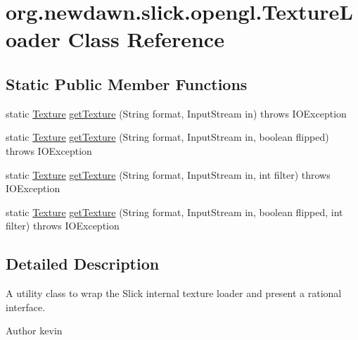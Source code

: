 \hypertarget{classorg_1_1newdawn_1_1slick_1_1opengl_1_1_texture_loader}{}\section{org.\+newdawn.\+slick.\+opengl.\+Texture\+Loader Class Reference}
\label{classorg_1_1newdawn_1_1slick_1_1opengl_1_1_texture_loader}
\subsection*{Static Public Member Functions}
\begin{DoxyCompactItemize}
\item 
static \mbox{\hyperlink{interfaceorg_1_1newdawn_1_1slick_1_1opengl_1_1_texture}{Texture}} \mbox{\hyperlink{classorg_1_1newdawn_1_1slick_1_1opengl_1_1_texture_loader_a742a83fc3fa1b8c4183e9950c7576adb}{get\+Texture}} (String format, Input\+Stream in)  throws I\+O\+Exception 
\item 
static \mbox{\hyperlink{interfaceorg_1_1newdawn_1_1slick_1_1opengl_1_1_texture}{Texture}} \mbox{\hyperlink{classorg_1_1newdawn_1_1slick_1_1opengl_1_1_texture_loader_a97fc2430793c0c8f883e6b9f6ab88758}{get\+Texture}} (String format, Input\+Stream in, boolean flipped)  throws I\+O\+Exception 
\item 
static \mbox{\hyperlink{interfaceorg_1_1newdawn_1_1slick_1_1opengl_1_1_texture}{Texture}} \mbox{\hyperlink{classorg_1_1newdawn_1_1slick_1_1opengl_1_1_texture_loader_a9fb5ca2c112a95bff54fc895b3c648e9}{get\+Texture}} (String format, Input\+Stream in, int filter)  throws I\+O\+Exception 
\item 
static \mbox{\hyperlink{interfaceorg_1_1newdawn_1_1slick_1_1opengl_1_1_texture}{Texture}} \mbox{\hyperlink{classorg_1_1newdawn_1_1slick_1_1opengl_1_1_texture_loader_accafa2eb13a83a40e3af6f4b196cd2e4}{get\+Texture}} (String format, Input\+Stream in, boolean flipped, int filter)  throws I\+O\+Exception 
\end{DoxyCompactItemize}


\subsection{Detailed Description}
A utility class to wrap the Slick internal texture loader and present a rational interface.

\begin{DoxyAuthor}{Author}
kevin 
\end{DoxyAuthor}


